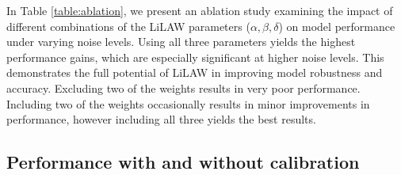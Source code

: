 \documentclass{article}
\theoremstyle{plain}
\theoremstyle{definition}
\theoremstyle{remark}
\begin{document}
\vspace{-1em}
In Table \ref{table:ablation}, we present an ablation study examining the impact of different combinations of the LiLAW parameters ($ \alpha,\beta,\delta$) on model performance under varying noise levels. Using all three parameters yields the highest performance gains, which are especially significant at higher noise levels. This demonstrates the full potential of LiLAW in improving model robustness and accuracy. Excluding two of the weights results in very poor performance. Including two of the weights occasionally results in minor improvements in performance, however including all three yields the best results.
\vspace{-0.5em}
\subsection{Performance with and without calibration}
\label{supp:calibration}
\end{document}
